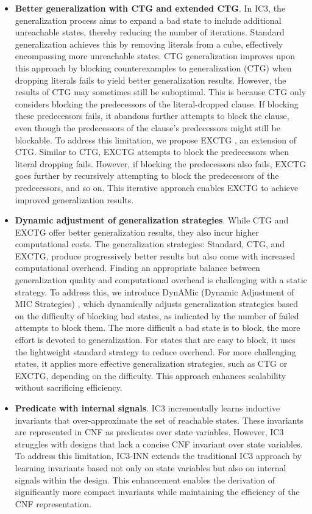 \documentclass[runningheads]{llncs}
\begin{document}
\begin{itemize}
    \item \textbf{Better generalization with CTG and extended CTG}. In IC3, the generalization process aims to expand a bad state to include additional unreachable states, thereby reducing the number of iterations. Standard generalization \cite{Standard} achieves this by removing literals from a cube, effectively encompassing more unreachable states. CTG generalization \cite{CTG} improves upon this approach by blocking counterexamples to generalization (CTG) when dropping literals fails to yield better generalization results. However, the results of CTG may sometimes still be suboptimal. This is because CTG only considers blocking the predecessors of the literal-dropped clause. If blocking these predecessors fails, it abandons further attempts to block the clause, even though the predecessors of the clause's predecessors might still be blockable. To address this limitation, we propose EXCTG \cite{DynAMic}, an extension of CTG. Similar to CTG, EXCTG attempts to block the predecessors when literal dropping fails. However, if blocking the predecessors also fails, EXCTG goes further by recursively attempting to block the predecessors of the predecessors, and so on. This iterative approach enables EXCTG to achieve improved generalization results.

    \item \textbf{Dynamic adjustment of generalization strategies}. While CTG and EXCTG offer better generalization results, they also incur higher computational costs. The generalization strategies: Standard, CTG, and EXCTG, produce progressively better results but also come with increased computational overhead. Finding an appropriate balance between generalization quality and computational overhead is challenging with a static strategy. To address this, we introduce DynAMic (Dynamic Adjustment of MIC Strategies) \cite{DynAMic}, which dynamically adjusts generalization strategies based on the difficulty of blocking bad states, as indicated by the number of failed attempts to block them. The more difficult a bad state is to block, the more effort is devoted to generalization. For states that are easy to block, it uses the lightweight standard strategy to reduce overhead. For more challenging states, it applies more effective generalization strategies, such as CTG or EXCTG, depending on the difficulty. This approach enhances scalability without sacrificing efficiency.

    \item \textbf{Predicate with internal signals}. IC3 incrementally learns inductive invariants that over-approximate the set of reachable states. These invariants are represented in CNF as predicates over state variables. However, IC3 struggles with designs that lack a concise CNF invariant over state variables. To address this limitation, IC3-INN \cite{IC3INN} extends the traditional IC3 approach by learning invariants based not only on state variables but also on internal signals within the design. This enhancement enables the derivation of significantly more compact invariants while maintaining the efficiency of the CNF representation.


\end{itemize}
\end{document}
